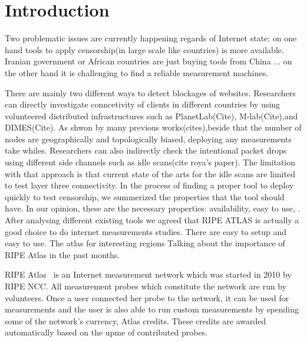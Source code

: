 \section{Introduction}
Two problematic issues are currently happening regards of Internet state: on one hand tools to apply
censorship(in large scale like countries) is more available. Iranian government or African countries
are just buying tools from China ... on the other hand it is challenging to find a reliable measurement machines.

There are mainly two different ways to detect blockages of websites. Researchers can directly
investigate conncetivity of clients in different countries by using volunteered distributed
infrastructures such as PlanetLab(Cite), M-lab(Cite),and DIMES(Cite). As shwon by many previous works(cites),beside that the number of
nodes are geographically and topologically biased, deploying any measurements take whiles.
Researchers can also indirectly check the intentional packet drops using different side channels
such as idle scans(cite roya's paper). The limitation with that approach is that current state of
the arts for the idle scans are limited to test layer three connectivity. 
In the process of finding a proper tool to deploy quickly to test censorship, we summerized the
properties that the tool should have. In our opinion, these are the necessary properties:
availability, easy to use,  .  After analysing
different existing tools we agreed that RIPE ATLAS is actually a good choice to do internet
measurements studies. There are easy to setup and easy to use. The atlas for interesting regions  
Talking about the importance of RIPE Atlas in the past months.

RIPE Atlas~\cite{atlas} is an Internet measurement network which was started in 2010 by RIPE NCC.
All measurement probes which constitute the network are run by volunteers.  Once a user connected
her probe to the network, it can be used for measurements and the user is also able to run custom
measurements by spending some of the network's currency, Atlas credits.  These credits are awarded
automatically based on the upme of contributed probes.

